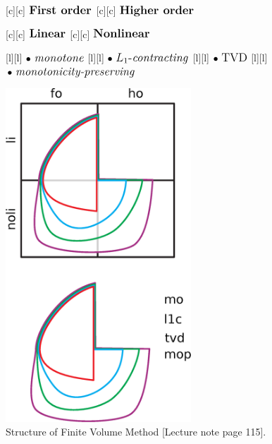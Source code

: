 \begin{figure}[ht]
	\centering
	\footnotesize

	[c] {$\textbf{\large First order}$}
	[c] {$\textbf{\large Higher order}$}

	[c] {$\textbf{\large Linear}$}
	[c] {$\textbf{\large Nonlinear}$}

	[l] {$\bullet \text{ \large \textit{monotone}}$}
	[l] {$\bullet \text{ \large $L_1$-\textit{contracting}}$}
	[l] {$\bullet \text{ \large TVD}$}
	[l] {$\bullet \text{ \large \textit{monotonicity-preserving}}$}

	\includegraphics[width=0.62\textwidth]{structureFVM.eps}
	\caption{Structure of Finite Volume Method [Lecture note page 115].}
	\label{\LABEL}
\end{figure}
